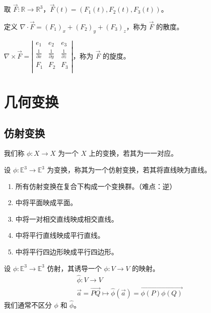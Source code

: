 \documentclass[lang=cn,10pt,thmcnt=section]{elegantbook}
\begin{document}
    取 $\vec{F}: \mathbb{R} \rightarrow \mathbb{R}^3$，$\vec{F}(t) = (F_1(t), F_2(t), F_3(t))$。
    
    \begin{definition}[散度]
    定义 $\nabla \cdot \vec{F} = (F_1)_x + (F_2)_y + (F_3)_z$，称为 $\vec{F}$ 的散度。
    \end{definition}
    
    \begin{definition}[旋度]
    $\nabla \times \vec{F} = \left| \begin{matrix}
        e_1&		e_2&		e_3\\
        \frac{1}{\partial x}&		\frac{1}{\partial y}&		\frac{1}{\partial z}\\
        F_1&		F_2&		F_3\\
    \end{matrix} \right|$，称为 $\vec{F}$ 的旋度。
    \end{definition}






\section{几何变换}
\subsection{仿射变换}
\begin{definition}[线性变换]
    我们称 $\phi: X \rightarrow X$ 为一个 $X$ 上的变换，若其为一一对应。
\end{definition}
\begin{definition}[仿射变换]
    设 $\phi: \mathbb{E}^3 \rightarrow \mathbb{E}^3$ 为变换，称其为一个仿射变换，若其将直线映为直线。
\end{definition}
\begin{proposition}
    \begin{enumerate}
        \item 所有仿射变换在复合下构成一个变换群。（难点：逆）
        \item 中将平面映成平面。
        \item 中将一对相交直线映成相交直线。
        \item 中将平行直线映成平行直线。
        \item 中将平行四边形映成平行四边形。
    \end{enumerate}
\end{proposition}

\begin{definition}[诱导映射]
    设 $\phi: \mathbb{E}^3 \rightarrow \mathbb{E}^3$ 仿射，其诱导一个 $\widehat{\phi}:V \rightarrow V$ 的映射。
    \[
    \begin{aligned}
        &\widehat{\phi}: V \rightarrow V \\
        &\vec{a} = \overrightarrow{PQ} \mapsto \widehat{\phi}(\vec{a}) = \overrightarrow{\phi(P)\phi(Q)}
    \end{aligned}
    \]
    我们通常不区分 $\phi$ 和 $\widehat{\phi}$。
\end{definition}
\end{document}
